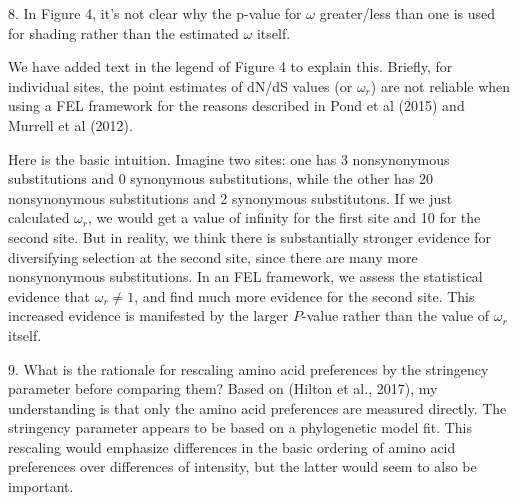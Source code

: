 \documentclass[11pt, oneside]{article}   	%
\begin{document}
8. In Figure 4, it's not clear why the p-value for $\omega$ greater/less than one is used for shading rather than the estimated $\omega$ itself. 

{\color{black}
We have added text in the legend of Figure 4 to explain this.
Briefly, for individual sites, the point estimates of dN/dS values (or $\omega_r$) are not reliable when using a FEL framework for the reasons described in Pond et al (2015) and Murrell et al (2012).

Here is the basic intuition. 
Imagine two sites: one has 3 nonsynonymous substitutions and 0 synonymous substitutions, while the other has 20 nonsynonymous substitutions and 2 synonymous substitutons.
If we just calculated $\omega_r$, we would get a value of infinity for the first site and 10 for the second site.
But in reality, we think there is substantially stronger evidence for diversifying selection at the second site, since there are many more nonsynonymous substitutions.
In an FEL framework, we assess the statistical evidence that $\omega_r \ne 1$, and find much more evidence for the second site.
This increased evidence is manifested by the larger $P$-value rather than the value of $\omega_r$ itself.}

9. What is the rationale for rescaling amino acid preferences by the stringency parameter before comparing them? Based on (Hilton et al., 2017), my understanding is that only the amino acid preferences are measured directly. The stringency parameter appears to be based on a phylogenetic model fit. This rescaling would emphasize differences in the basic ordering of amino acid preferences over differences of intensity, but the latter would seem to also be important. 
\end{document}

